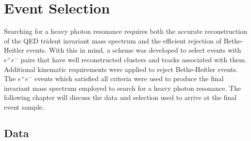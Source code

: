 %
%
%
%
\chapter{Event Selection}

Searching for a heavy photon resonance requires both the accurate 
reconstruction of the QED trident invariant mass spectrum and the efficient 
rejection of Bethe-Heitler events.  With this in mind, a scheme 
was developed to select events with $e^+e^-$ pairs that have well 
reconstructed clusters and tracks associated with them.  Additional kinematic 
requirements were applied to reject Bethe-Heitler events.  The  $e^+e^-$ events
which satisfied all criteria were used to produce the final invariant mass 
spectrum employed to search for a heavy photon resonance.  The following chapter
will discuss the data and selection used to arrive at the final event sample.   

\section{Data}

